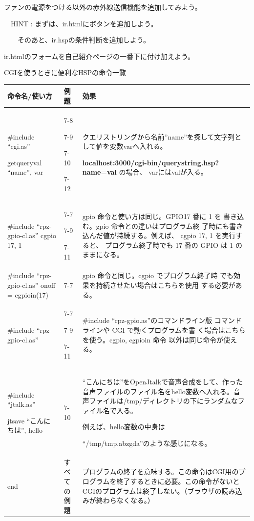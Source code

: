\documentclass[a4paper,12pt,dvipdfmx]{jarticle}
\begin{document}
\bigskip


ファンの電源をつける以外の赤外線送信機能を追加してみよう。

\ \ HINT :
まずは、ir.htmlにボタンを追加しよう。

\ \ \ \ そのあと、ir.hspの条件判断を追加しよう。

ir.htmlのフォームを自己紹介ページの一番下に付け加えよう。


\bigskip


\bigskip


\clearpage
CGIを使うときに便利なHSPの命令一覧

\begin{flushleft}
\tablefirsthead{}
\tablehead{}
\tabletail{}
\tablelasttail{}
\begin{supertabular}{|m{5.467cm}|m{3.181cm}|m{7.7cm}|}
\hline
命令名/使い方 &
例題 &
効果\\\hline
\#include “cgi.as”

getqueryval “name”, var &
7-8

7-9

7-10

7-12 &
クエリストリングから名前”name”を探して文字列として値を変数varへ入れる。

	\textbf{localhost:3000/cgi-bin/querystring.hsp?name=val}
	の場合、
varにはvalが入る。\\\hline

\#include “rpz-gpio-cl.as”
cgpio 17, 1&
7-7

7-9

7-11&
gpio 命令と使い方は同じ。GPIO17 番に 1 を
書き込む。gpio 命令との違いはプログラム終
了時にも書き込んだ値が持続する。例えば、
cgpio 17, 1 を実行すると、
プログラム終了時でも 17 番の GPIO は 1 の
ままになる。\\\hline

\#include “rpz-gpio-cl.as”
onoff = cgpioin(17)&
7-7&
gpio 命令と同じ。cgpio でプログラム終了時
でも効果を持続させたい場合はこちらを使用
する必要がある。\\\hline

\#include “rpz-gpio-cl.as”&
7-7

7-9

7-11&
\#include “rpz-gpio.as”のコマンドライン版
コマンドラインや CGI で動くプログラムを書
く場合はこちらを使う。cgpio, cgpioin 命令
以外は同じ命令が使える。\\\hline

\#include “jtalk.as”

jtsave “こんにちは”, hello &
7-10 &
“こんにちは”をOpenJtalkで音声合成をして、作った音声ファイルのファイル名をhello変数へ入れる。音声ファイルは/tmp/ディレクトリの下にランダムなファイル名で入る。

例えば、hello変数の中身は

“/tmp/tmp.abzgda”のような感じになる。 \\\hline
end &
すべての例題 &
プログラムの終了を意味する。この命令はCGI用のプログラムを終了するときに必要。この命令がないとCGIのプログラムは終了しない。（ブラウザの読み込みが終わらなくなる。）\\\hline
\end{supertabular}
\end{flushleft}
\end{document}
